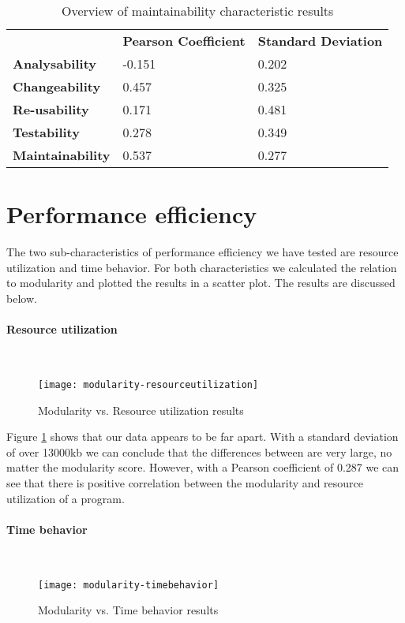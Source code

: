\documentclass[twoside]{uva-inf-bachelor-thesis}
\newcommand{\myparagraph}[1]{\paragraph{#1}\mbox{}\\}
\begin{document}
\begin{table}[H]
\centering
\caption{Overview of maintainability characteristic results}
\label{table:main-overview}
\begin{tabular}{lll}
                         & \textbf{Pearson Coefficient} & \textbf{Standard Deviation} \\
\textbf{Analysability}   & -0.151                       & 0.202                       \\
\textbf{Changeability}   & 0.457                        & 0.325                       \\
\textbf{Re-usability}    & 0.171                        & 0.481                       \\
\textbf{Testability}     & 0.278                        & 0.349                       \\
\textbf{Maintainability} & 0.537                        & 0.277                      
\end{tabular}
\end{table}

\section{Performance efficiency}
The two sub-characteristics of performance efficiency we have tested are resource utilization and time behavior. For both characteristics we calculated the relation to modularity and plotted the results in a scatter plot. The results are discussed below.

\myparagraph{Resource utilization}
\begin{figure}[H]
    \label{figure:perf-res}
    \caption{Modularity vs. Resource utilization results}
    \centering
        \texttt{[image: modularity-resourceutilization]}
\end{figure}

Figure \ref{figure:perf-res} shows that our data appears to be far apart. With a standard deviation of over 13000kb we can conclude that the differences between are very large, no matter the modularity score. However, with a Pearson coefficient of 0.287 we can see that there is positive correlation between the modularity and resource utilization of a program.

\myparagraph{Time behavior}
\begin{figure}[H]
    \label{figure:perf-time}
    \caption{Modularity vs. Time behavior results}
    \centering
        \texttt{[image: modularity-timebehavior]}
\end{figure}
\end{document}
